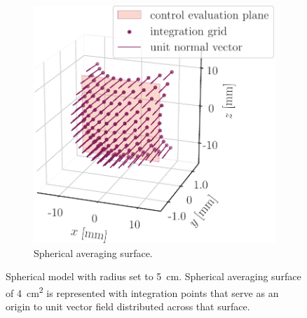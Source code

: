 \begin{figure}[ht]
\begin{subfigure}[b]{0.47\textwidth}
        \includegraphics[width=\linewidth]{artwork/spherical_surface.pdf}
        \caption{Spherical averaging surface.}
        \label{fig:spherical_surface}
        \end{subfigure}
    
    \caption{Spherical model with radius set to \SI{5}{\cm}. Spherical averaging surface of \SI{4}{\cm\squared} is represented with integration points that serve as an origin to unit vector field distributed across that surface.}
    \label{fig:sphere}
\end{figure}
